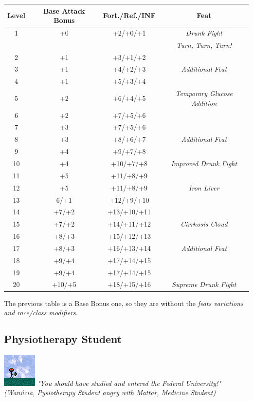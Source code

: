 \documentclass[ letterpaper,12pt]{article}
\begin{document}
{\begin{center} \begin{tabular}{|c||c|c|c|}
\hline
{\bf Level}&{\bf Base Attack Bonus}&{\bf Fort./Ref./INF}&{\bf Feat}\\
\hline
1&+0&+2/+0/+1&{\it Drunk Fight}\\
&&&{\it Turn, Turn, Turn!} \\
\hline
2&+1&+3/+1/+2&\\
\hline
3&+1&+4/+2/+3&{\it Additional Feat}\\
\hline
4&+1&+5/+3/+4&\\
\hline
5&+2&+6/+4/+5&{\it Temporary Glucose Addition}\\
\hline
6&+2&+7/+5/+6&\\
\hline
7&+3&+7/+5/+6&\\
\hline
8&+3&+8/+6/+7&{\it Additional Feat}\\
\hline
9&+4&+9/+7/+8&\\
\hline
10&+4&+10/+7/+8&{\it Improved Drunk Fight}\\
\hline
11&+5&+11/+8/+9&\\
\hline
12&+5&+11/+8/+9&{\it Iron Liver}\\
\hline
13&6/+1&+12/+9/+10&\\
\hline
14&+7/+2&+13/+10/+11&\\
\hline
15&+7/+2&+14/+11/+12&{\it Cirrhosis Cloud}\\
\hline
16&+8/+3&+15/+12/+13&\\
\hline
17&+8/+3&+16/+13/+14&{\it Additional Feat}\\
\hline
18&+9/+4&+17/+14/+15&\\
\hline
19&+9/+4&+17/+14/+15&\\
\hline
20&+10/+5&+18/+15/+16&{\it Supreme Drunk Fight}\\
\hline
\end{tabular} \end{center}

The previous table is a Base Bonus one, so they are without the {\it feats variations and race/class modifiers}.\\

\subsection{Physiotherapy Student}
\includegraphics{../data/classes/Img/fisioterapia.png}
{\it "You should have studied and entered the Federal University!"\\
     (Wanúcia, Pysiotherapy Student angry with Mattar, Medicine Student)}\\

}
\end{document}
